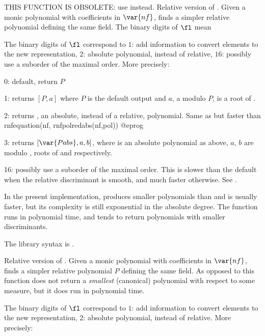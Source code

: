 \label{se:rnfpolredabs}
THIS FUNCTION IS OBSOLETE: use  instead.
Relative version of . Given a monic polynomial 
with coefficients in $\var{nf}$, finds a simpler relative polynomial defining
the same field. The binary digits of $\fl$ mean

The binary digits of $\fl$ correspond to $1$: add information to convert
elements to the new representation, $2$: absolute polynomial, instead of
relative, $16$: possibly use a suborder of the maximal order. More precisely:

0: default, return $P$

1: returns $[P,a]$ where $P$ is the default output and $a$,
a  modulo $P$, is a root of .

2: returns , an absolute, instead of a relative, polynomial.
Same as but faster than
\bprog
  rnfequation(nf, rnfpolredabs(nf,pol))
@eprog

3: returns $[\var{Pabs},a,b]$, where  is an absolute polynomial
as above, $a$, $b$ are  modulo , roots of 
and  respectively.

16: possibly use a suborder of the maximal order. This is slower than the
default when the relative discriminant is smooth, and much faster otherwise.
See .

 In the present implementation, 
produces smaller polynomials than  and is usually
faster, but its complexity is still exponential in the absolute degree.
The function  runs in polynomial time, and  tends  to
return polynomials with smaller discriminants.

The library syntax is .

\label{se:rnfpolredbest}
Relative version of . Given a monic polynomial 
with coefficients in $\var{nf}$, finds a simpler relative polynomial $P$
defining the same field. As opposed to  this function does
not return a \emph{smallest} (canonical) polynomial with respect to some
measure, but it does run in polynomial time.

The binary digits of $\fl$ correspond to $1$: add information to convert
elements to the new representation, $2$: absolute polynomial, instead of
relative. More precisely:

